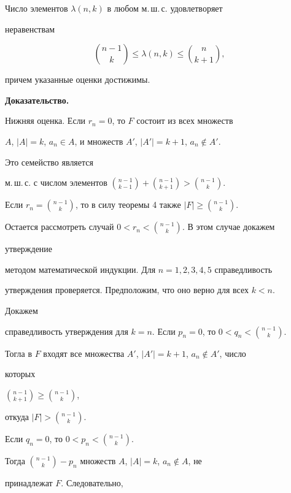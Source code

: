  


 


\begin{thm} 


Число элементов $\lambda(n,k)$ в любом м.\,ш.\,с. удовлетворяет 


неравенствам 


$$ 


\binom{n-1}{k}\le\lambda(n,k)\le\binom{n}{k+1}, 


$$ 


причем указанные оценки достижимы. 


\end{thm} 


 


{\bf Доказательство.} 


Нижняя оценка. Если $r_n=0$, то $F$ состоит из всех множеств 


$A$, $|A|=k$, $a_n\in A$, и множеств $A'$, $|A'|=k+1$, $a_n\notin A'$. 


Это семейство является 


м.\,ш.\,с. с числом элементов $\binom{n-1}{k-1}+\binom{n-1}{k+1}> 


\binom{n-1}{k}$. 


Если $r_n=\binom{n-1}{k}$, то в силу теоремы 4 также $|F|\ge 


\binom{n-1}{k}$. 


Остается рассмотреть случай $0<r_n<\binom{n-1}{k}$. В этом случае докажем 


утверждение 


методом математической индукции. Для $n=1,2,3,4,5$ справедливость 


утверждения проверяется. Предположим, что оно верно для всех $k<n$. 


Докажем 


справедливость утверждения для $k=n$. Если $p_n=0$, то $0<q_n< 


\binom{n-1}{k}$. 


Тогла в $F$ входят все множества $A'$, $|A'|=k+1$, $a_n\notin A'$, число 


которых 


$\binom{n-1}{k+1}\ge \binom{n-1}{k}$, 


откуда $|F|>\binom{n-1}{k}$. 


Если $q_n=0$, то $0<p_n<\binom{n-1}{k}$. 


Тогда $\binom{n-1}{k}-p_n$ множеств $A$, $|A|=k$, $a_n\notin A$, не 


принадлежат $F$. Следовательно, 


